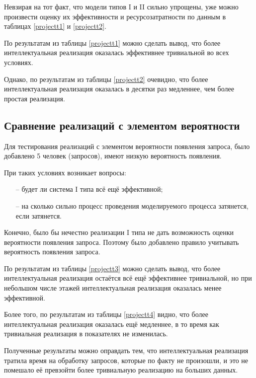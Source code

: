 		Невзирая на тот факт, что модели типов I и II сильно упрощены, уже можно произвести оценку их
			эффективности и ресурсозатратности  по данным в таблицах \ref{projectt1}  и \ref{projectt2}.
		
		

			По результатам из таблицы \ref{projectt1}  можно сделать вывод, что более интеллектуальная реализация
				оказалась эффективнее тривиальной во всех условиях.

		
			
			Однако, по результатам из таблицы \ref{projectt2}  очевидно, что более интеллектуальная реализация
				оказалась в десятки раз медленнее, чем более простая реализация.

	\subsection{Сравнение реализаций с элементом вероятности}
		
		Для тестирования реализаций с элементом вероятности появления запроса, было добавлено 5 человек (запросов),
			имеют низкую вероятность появления.

		При таких условиях возникает вопросы:
		\begin{itemize}
			\item[--] будет ли система  I типа всё ещё эффективной;
			\item[--] на сколько сильно процесс проведения моделируемого процесса затянется, если затянется.
		\end{itemize}

		Конечно, было бы нечестно реализации I типа не дать возможность оценки вероятности появления запроса.
			Поэтому было добавлено правило учитывать вероятность появления запроса.

		

		По результатам из таблицы \ref{projectt3}  можно сделать вывод, что более интеллектуальная реализация
			остаётся всё ещё эффективнее тривиальной, но  при небольшом числе этажей интеллектуальная реализация
			оказалась менее эффективной.

		

		Более того, по результатам из таблицы \ref{projectt4}  видно, что более интеллектуальная реализация
			оказалась ещё медленнее, в то время как тривиальная реализация в показателях не изменилась.


		Полученные результаты можно оправдать тем, что интеллектуальная реализация тратила время на обработку
			запросов, которые по факту не произошли, и это не помешало её превзойти более тривиальную реализацию
			на больших данных.

